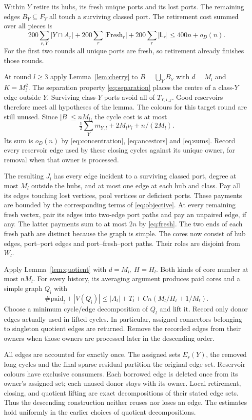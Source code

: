 \documentclass[11pt]{article}
\theoremstyle{remark}\newtheorem*{remark}{Remark}
\newcommand{\Lost}{\mathsf L}
\begin{document}
Within $Y$ retire its hubs, its fresh unique ports and its lost ports.
The remaining edges $B_Y\subseteq F_Y$ all touch a surviving classed
port. The retirement cost summed over all pieces is
\[
 200\sum_{r,Y}|Y\cap A_r|+200\sum_r|\mathrm{Fresh}_r|
      +200\sum_r|\Lost_r|
 \le400n+o_D(n).
\]
For the first two rounds all unique ports are fresh, so retirement
already finishes those rounds.

At round $l\ge3$ apply Lemma~\ref{lem:cherry} to
$B=\bigcup_Y B_Y$ with $d=M_l$ and $K=M_l^2$.
The separation property \eqref{eq:separation} places the centre of a
class-$Y$ edge outside $Y$. Surviving class-$Y$ ports avoid all of
$T_{Y,l,j}$. Good reservoirs therefore meet all hypotheses of the
lemma. The colours for this target round are still unused.
Since $|B|\le nM_l$, the cycle cost is at most
\[
 \tfrac12\sum_Ym_{Y,l}+2M_l\nu_l+n/(2M_l).
\]
Its sum is $o_D(n)$ by \eqref{eq:concentration},
\eqref{eq:ancestors} and \eqref{eq:sums}.
Record every reservoir edge used by these closing cycles against its
unique owner, for removal when that owner is processed.

The resulting $J_l$ has every edge incident to a surviving classed
port, degree at most $M_l$ outside the hubs, and at most one edge at
each hub and class. Pay all its edges touching lost vertices, pool
vertices or deficient ports. These payments are bounded by the
corresponding terms of \eqref{eq:objective}. At every remaining fresh
vertex, pair its edges into two-edge port paths and pay an unpaired
edge, if any. The latter payments sum to at most $2n$ by
\eqref{eq:fresh}. The two ends of each fresh path are distinct because the graph
is simple. The cores now consist of hub edges, port--port edges and
port--fresh--port paths. Their roles are disjoint from $W_l$.

Apply Lemma~\ref{lem:quotient} with $d=M_l$, $H=H_l$. Both kinds
of core number at most $nM_l$. For every history, its averaging
argument produces paid cores and a simple graph $Q_l$ with
\begin{equation}\label{eq:Ql}
 \#\mathrm{paid}_l+|V(Q_l)|
 \le |A_l|+T_l+C n(M_l/H_l+1/M_l).
\end{equation}
Choose a minimum cycle/edge decomposition of $Q_l$ and lift it.
Record only donor edges actually used in lifted cycles. In particular,
assigned connectors belonging to singleton quotient edges are returned.
Remove the recorded edges from their owners when those owners are
processed later in the descending order.

All edges are accounted for exactly once. The assigned sets
$E_r(Y)$, the removed long cycles and the final sparse residual
partition the original edge set. Reservoir colours have exclusive
consumers. Each borrowed edge is deleted once from its owner's
assigned set; each unused donor stays with its owner. Local retirement,
closing, and quotient lifting are exact decompositions of their stated
edge sets. Thus the descending construction neither reuses nor loses
an edge. The estimates hold uniformly in the earlier choices of
quotient decompositions.
\end{document}
